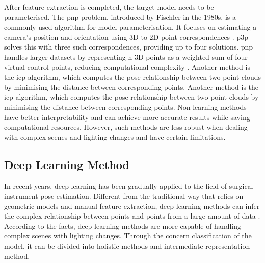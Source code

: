 \documentclass[12pt]{article}
\begin{document}
After feature extraction is completed, the target model needs to be parameterised. The  \gls{pnp} problem, introduced by Fischler in the 1980s, is a commonly used algorithm for model parameterisation. It focuses on estimating a camera's position and orientation using 3D-to-2D point correspondences \cite{Lu_2018}. \gls{p3p} solves this with three such correspondences, providing up to four solutions. \gls{pnp} handles larger datasets by representing n 3D points as a weighted sum of four virtual control points, reducing computational complexity \cite{10.1007/s11263-008-0152-6}. Another method is the \gls{icp} algorithm\cite{bellekens2014survey}, which computes the pose relationship between two-point clouds by minimising the distance between corresponding points. Another method is the \gls{icp} algorithm\cite{bellekens2014survey}, which computes the pose relationship between two-point clouds by minimising the distance between corresponding points.
Non-learning methods have better interpretability and can achieve more accurate results while saving computational resources. However, such methods are less robust when dealing with complex scenes and lighting changes and have certain limitations\cite{bellekens2014survey}.


\subsection{Deep Learning Method}
In recent years, deep learning has been gradually applied to the field of surgical instrument pose estimation. Different from the traditional way that relies on geometric models and manual feature extraction, deep learning methods can infer the complex relationship between points and points from a large amount of data \cite{ bellekens2014survey}. According to the facts, deep learning methods are more capable of handling complex scenes with lighting changes\cite{fan2024reinforcement}. Through the concern classification of the model, it can be divided into holistic methods and intermediate representation method.
\end{document}
